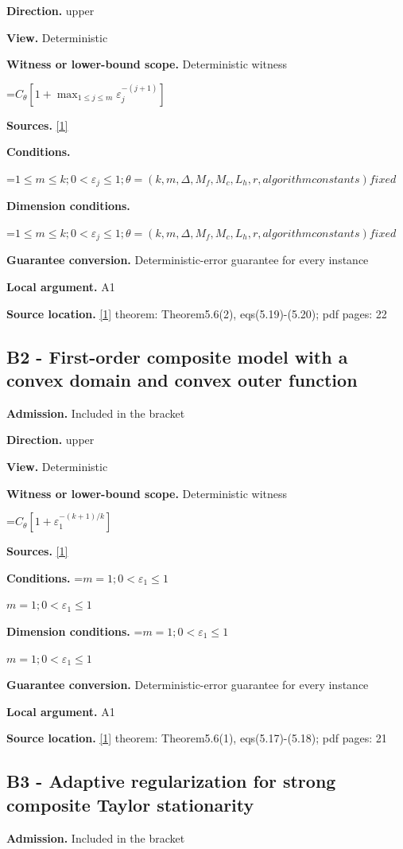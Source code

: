 \documentclass[10pt,a4paper]{article}
\newcommand{\AtlasMath}[1]{\par\begingroup\centering\setbox0=\hbox{$\displaystyle #1$}\ifdim\wd0>1.4\linewidth\typeout{ATLAS WIDE FORMULA: \the\wd0}\fi\ifdim\wd0>\linewidth\resizebox{\linewidth}{!}{\box0}\else\box0\fi\par\endgroup}
\newcommand{\AtlasInlineMath}[1]{\begingroup\setbox0=\hbox{$#1$}\ifdim\wd0>.4\linewidth\endgroup\AtlasMath{#1}\else\endgroup$#1$\fi}
\begin{document}
\textbf{Direction.} upper

\textbf{View.} Deterministic

\textbf{Witness or lower-bound scope.} Deterministic witness

\AtlasMath{C_\theta[1+\max_{1\le j\le m}\varepsilon_j^{-(j+1)}]}
\textbf{Sources.} \href{https://optimization-online.org/wp-content/uploads/2020/01/7590.pdf}{[1]}

\textbf{Conditions.} 
\AtlasMath{1\le m\le k;0<\varepsilon_j\le 1;\theta=(k,m,\Delta,M_f,M_c,L_h,r,algorithm constants) fixed}


\textbf{Dimension conditions.} 
\AtlasMath{1\le m\le k;0<\varepsilon_j\le 1;\theta=(k,m,\Delta,M_f,M_c,L_h,r,algorithm constants) fixed}


\textbf{Guarantee conversion.} Deterministic-error guarantee for every instance

\textbf{Local argument.} A1

\textbf{Source location.} \href{https://optimization-online.org/wp-content/uploads/2020/01/7590.pdf}{[1]} theorem: Theorem5.6(2), eqs(5.19)-(5.20); pdf pages: 22

\subsection{B2 - First-order composite model with a convex domain and convex outer function}
\textbf{Admission.} Included in the bracket

\textbf{Direction.} upper

\textbf{View.} Deterministic

\textbf{Witness or lower-bound scope.} Deterministic witness

\AtlasMath{C_\theta[1+\varepsilon_1^{-(k+1)/k}]}
\textbf{Sources.} \href{https://optimization-online.org/wp-content/uploads/2020/01/7590.pdf}{[1]}

\textbf{Conditions.} \AtlasInlineMath{m=1;0<\varepsilon_1\le 1}

\textbf{Dimension conditions.} \AtlasInlineMath{m=1;0<\varepsilon_1\le 1}

\textbf{Guarantee conversion.} Deterministic-error guarantee for every instance

\textbf{Local argument.} A1

\textbf{Source location.} \href{https://optimization-online.org/wp-content/uploads/2020/01/7590.pdf}{[1]} theorem: Theorem5.6(1), eqs(5.17)-(5.18); pdf pages: 21

\subsection{B3 - Adaptive regularization for strong composite Taylor stationarity}
\textbf{Admission.} Included in the bracket
\end{document}
